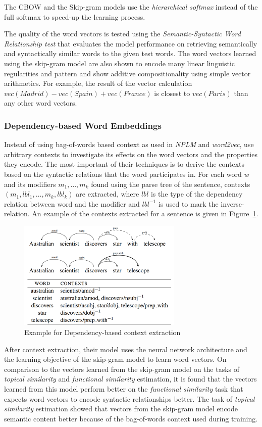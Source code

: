 The CBOW and the Skip-gram models use the \emph{hierarchical softmax} \citep{morin2005hierarchical} instead of the full softmax to speed-up the learning process.

The quality of the word vectors is tested using the \emph{Semantic-Syntactic Word Relationship test} that evaluates the model performance on retrieving semantically and syntactically similar words to the given test words. The word vectors learned using the skip-gram model are also shown to encode many linear linguistic regularities and pattern \citep{mikolov2013linguistic} and show additive compositionality using simple vector arithmetics. For example, the result of the vector calculation $vec(Madrid) - vec(Spain) + vec(France)$ is closest to $vec(Paris)$ than any other word vectors.

\subsubsection{Dependency-based Word Embeddings}
Instead of using bag-of-words based context as used in \emph{NPLM} and \emph{word2vec}, \cite{levy2014dependencybased} use arbitrary contexts to investigate its effects on the word vectors and the properties they encode. The most important of their techniques is to derive the contexts based on the syntactic relations that the word participates in. For each word $w$ and its modifiers $m_1, \ldots, m_k$ found using the parse tree of the sentence, contexts $(m_{1}, lbl_{1}, \ldots, m_{k}, lbl_{k})$ are extracted, where $lbl$ is the type of the dependency relation between word and the modifier and $lbl^{-1}$ is used to mark the inverse-relation. An example of the contexts extracted for a sentence is given in Figure~\ref{fig:dep:context}.
\begin{figure}[h!]
    \centering
        \includegraphics[width=0.7\textwidth]{figs/dependency_context.png}
    \caption{Example for Dependency-based context extraction}
    \label{fig:dep:context}
\end{figure}
After context extraction, their model uses the neural network architecture and the learning objective of the skip-gram model to learn word vectors. On comparison to the vectors learned from the skip-gram model on the tasks of \emph{topical similarity} and \emph{functional similarity} estimation, it is found that the vectors learned from this model perform better on the \emph{functional similarity} task that expects word vectors to encode syntactic relationships better. The task of \emph{topical similarity} estimation showed that vectors from the skip-gram model encode semantic content better because of the bag-of-words context used during training.

